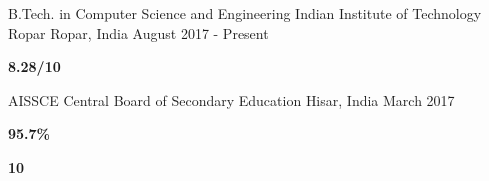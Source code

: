 

\begin{cventries}

  \cventry
    {B.Tech. in Computer Science and Engineering} %
    {Indian Institute of Technology Ropar} %
    {Ropar, India} %
    {August 2017 - Present} %
    {
      \setlength\multicolsep{-12pt}
      \begin{multicols}{2}
      \begin{cvschool} %
        \item[] \textbf{8.28/10}
      \end{cvschool}
      \end{multicols}
    }


\cvedu
    {AISSCE} %
    {Central Board of Secondary Education} %
    {Hisar, India} %
    {March 2017} %
    {
      \setlength\multicolsep{-10pt}
      \begin{multicols}{2}
      \begin{cvschool} %
        \item[] \textbf{95.7\%}
        \item[]  \textbf{10}
      \end{cvschool}
      \end{multicols}
    }


\end{cventries}
